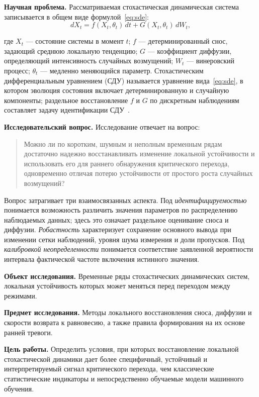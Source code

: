 \documentclass[12pt,a4paper]{article}
\numberwithin{table}{section}
\numberwithin{figure}{section}
\newcommand{\term}[1]{\textit{#1}}
\begin{document}
\textbf{Научная проблема.} Рассматриваемая стохастическая динамическая система
записывается в общем виде формулой~\eqref{eq:sde}:
\begin{equation}
\tag{1.1}
\label{eq:sde}
 dX_t=f(X_t,\theta_t)\,dt+G(X_t,\theta_t)\,dW_t,
\end{equation}

где $X_t$ --- состояние системы в момент $t$; $f$ --- детерминированный снос,
задающий среднюю локальную тенденцию; $G$ --- коэффициент диффузии,
определяющий интенсивность случайных возмущений; $W_t$ --- винеровский
процесс; $\theta_t$ --- медленно меняющийся параметр. Стохастическим
дифференциальным уравнением (СДУ) называется уравнение вида~\eqref{eq:sde}, в
котором эволюция состояния включает детерминированную и случайную компоненты;
раздельное восстановление $f$ и $G$ по дискретным наблюдениям составляет
задачу идентификации СДУ~\cite{bonalli2026}.

\textbf{Исследовательский вопрос.} Исследование отвечает на вопрос:

\begin{quote}
Можно ли по коротким, шумным и неполным временным рядам достаточно надежно
восстанавливать изменение локальной устойчивости и использовать его для
раннего обнаружения критического перехода, одновременно отличая потерю
устойчивости от простого роста случайных возмущений?
\end{quote}

Вопрос затрагивает три взаимосвязанных аспекта. Под \term{идентифицируемостью}
понимается возможность различить значения параметров по распределению
наблюдаемых данных; здесь это означает раздельное оценивание сноса и диффузии.
\term{Робастность} характеризует сохранение основного вывода при изменении
сетки наблюдений, уровня шума измерения и доли пропусков. Под
\term{калибровкой неопределенности} понимается соответствие заявленной
вероятности интервала фактической частоте включения истинного значения.

\textbf{Объект исследования.} Временные ряды стохастических динамических
систем, локальная устойчивость которых может меняться перед переходом между
режимами.

\textbf{Предмет исследования.} Методы локального восстановления сноса,
диффузии и скорости возврата к равновесию, а также правила формирования на их
основе ранней тревоги.

\textbf{Цель работы.} Определить условия, при которых восстановление
локальной стохастической динамики дает более специфичный, устойчивый и
интерпретируемый сигнал критического перехода, чем классические статистические
индикаторы и непосредственно обучаемые модели машинного обучения.
\end{document}
